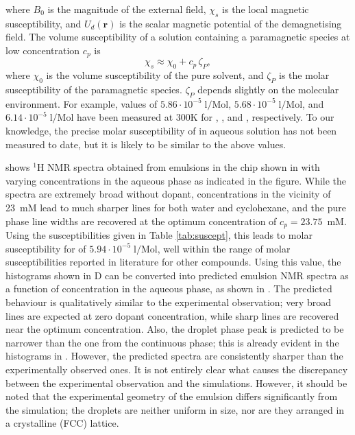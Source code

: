 where $B_0$ is the magnitude of the external field, $\chi_s$ is the local
magnetic susceptibility, and $U_d(\mathbf{r})$ is the scalar magnetic potential
of the demagnetising field. The volume susceptibility of a solution containing a
paramagnetic species at low concentration $c_p$ is
\begin{equation}
    \chi_s \approx \chi_0 + c_p\,\zeta_P,
\end{equation}
where $\chi_0$ is the volume susceptibility of the pure solvent,
and $\zeta_P$ is the
molar susceptibility of the paramagnetic species. $\zeta_P$ depends
slightly on the molecular environment. For example, values of
$5.86\cdot 10^{-5}\;\mathrm{l/\text{Mol}}$,
$5.68\cdot 10^{-5}\;\mathrm{l/\text{Mol}}$, and
$6.14\cdot 10^{-5}\;\mathrm{l/\text{Mol}}$ have been measured at 300K for
, , and , respectively.\cite{Takikawa:2010iw}
To our knowledge, the precise molar susceptibility of  in
aqueous solution has not been measured to date, but it is likely to be
similar to the above values.

 shows $^1$H NMR spectra obtained from emulsions in the chip
shown in  with varying  concentrations in the aqueous
phase as indicated in the figure. While the spectra are extremely broad without dopant,
concentrations in the vicinity of 23~mM lead to much sharper lines for both water and cyclohexane,
and the pure phase line widths are recovered at the optimum concentration of $c_p=23.75$~mM.
Using the susceptibilities given in
Table \ref{tab:suscept}, this leads to molar susceptibility for 
of $5.94\cdot 10^{-5}\;\mathrm{l/\text{Mol}}$, well within the range
 of molar susceptibilities reported in literature for other 
 compounds. Using this value, the histograms
shown in D can be converted into
predicted emulsion NMR spectra as a function of 
concentration in the aqueous phase,
as shown in .
The predicted behaviour is qualitatively similar to the experimental observation; very broad
lines are expected at zero dopant concentration, while sharp lines are recovered near the optimum
concentration. Also, the droplet phase peak is predicted to be narrower than the one from the continuous phase; this is already evident in the histograms in .  However, the predicted spectra are consistently sharper than the experimentally
observed ones.
It is not entirely clear what causes the discrepancy between the experimental observation
and the simulations. However, it should be noted that the experimental geometry of the emulsion
differs significantly from the simulation; the droplets are neither uniform in size, nor are they
arranged in a crystalline (FCC) lattice.


